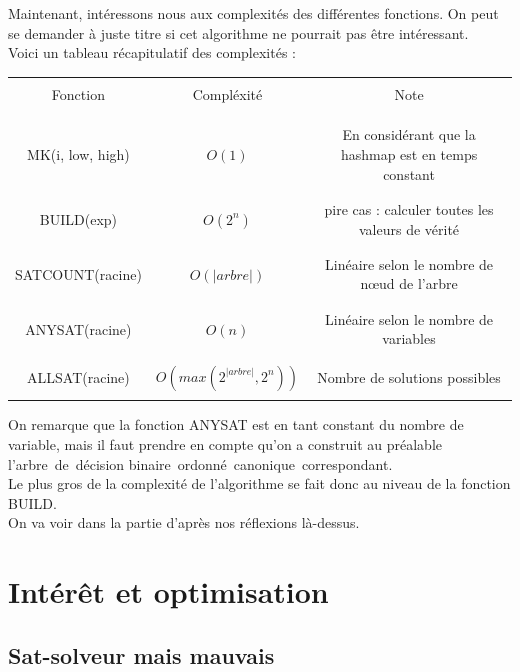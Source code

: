 \documentclass[a4paper, oneside]{report}
\newcommand{\adb}{arbre~de~décision binaire~}
\newcommand{\adbo}{\adb ordonné~}
\newcommand{\adboc}{\adbo canonique~}
\begin{document}
Maintenant, intéressons nous aux complexités des différentes fonctions. On peut se demander à juste titre si cet algorithme ne pourrait pas être intéressant.\\
Voici un tableau récapitulatif des complexités :\\
\begin{center}
\begin{tabular}{|c|c|c|}
\hline 
&&\\
Fonction & Compléxité & Note \\ 
&&\\
&&\\
\hline 
&&\\
MK(i, low, high) & $O(1)$ & En considérant que la hashmap est en temps constant \\ 
&&\\
\hline 
&&\\
BUILD(exp) & $O(2^n)$ & pire cas : calculer toutes les valeurs de vérité \\ 
&&\\
\hline 
&&\\
SATCOUNT(racine) & $O(|arbre|)$ & Linéaire selon le nombre de nœud de l'arbre \\ 
&&\\
\hline 
&&\\
ANYSAT(racine) & $O(n)$ & Linéaire selon le nombre de variables \\ 
&&\\
\hline 
&&\\
ALLSAT(racine) & $O(max(2^{|arbre|}, 2^n))$ & Nombre de solutions possibles \\ 
&&\\
\hline 
\end{tabular} 
\end{center}

On remarque que la fonction ANYSAT est en tant constant du nombre de variable, mais il faut prendre en compte qu'on a construit au préalable l'\adboc correspondant.\\
Le plus gros de la complexité de l'algorithme se fait donc au niveau de la fonction BUILD.\\
On va voir dans la partie d'après nos réflexions là-dessus.

\chapter{Intérêt et optimisation}

\section{Sat-solveur mais mauvais}
\end{document}
